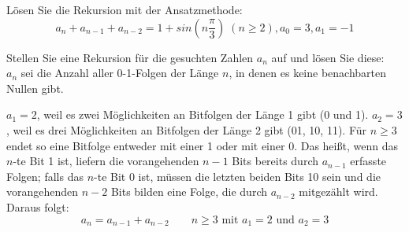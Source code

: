 \documentclass[a4paper, 12pt, margins=3cm]{homework}
\begin{document}
  \begin{problem}
    Lösen Sie die Rekursion mit der Ansatzmethode:
    \[ a_n + a_{n-1} + a_{n-2} = 1 + sin(n\frac{\pi}{3}) \; (n \geq 2), a_0 = 3, a_1 = -1 \]
  \end{problem}
  \begin{solution}
    
  \end{solution}


  \begin{problem}
    Stellen Sie eine Rekursion für die gesuchten Zahlen $a_n$ auf und lösen Sie diese: \\

    $a_n$ sei die Anzahl aller 0-1-Folgen der Länge $n$, in denen es keine benachbarten
    Nullen gibt.
  \end{problem}
  \begin{solution}
    $a_1 = 2$, weil es zwei Möglichkeiten an Bitfolgen der Länge 1 gibt (0 und 1).
    $a_2 = 3$, weil es drei Möglichkeiten an Bitfolgen der Länge 2 gibt (01, 10, 11).
    Für $n \geq 3$ endet so eine Bitfolge entweder mit einer 1 oder mit einer 0.
    Das heißt, wenn das $n$-te Bit 1 ist, liefern die vorangehenden $n-1$ Bits
    bereits durch $a_{n-1}$ erfasste Folgen; falls das $n$-te Bit 0 ist, müssen
    die letzten beiden Bits 10 sein und die vorangehenden $n-2$ Bits bilden eine
    Folge, die durch $a_{n-2}$ mitgezählt wird. Daraus folgt:
    \[ a_n = a_{n-1} + a_{n-2} \qquad n\geq 3 \text{ mit } a_1 = 2 \text{ und } a_2 = 3 \]
  \end{solution}
\end{document}

